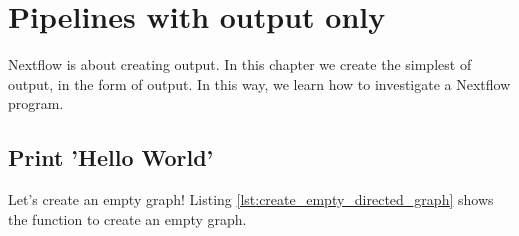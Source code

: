 \chapter{Pipelines with output only}
\label{sec:Pipelines-with-output-only}

Nextflow is about creating output.
In this chapter we create the simplest of output, 
in the form of output.
In this way, we learn how to investigate a Nextflow program.

\section{Print 'Hello World'}
\label{subsec:print-hello-world}

Let's create an empty graph! 
Listing \ref{lst:create_empty_directed_graph} 
shows the function to create an empty graph.



